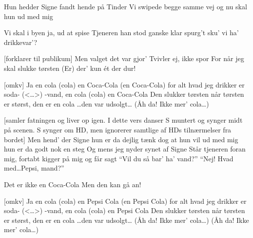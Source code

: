 \documentclass[a4paper,11pt]{article}
\begin{document}
\begin{song}

%
        Hun hedder Signe
        fandt hende på Tinder
        Vi swipede begge samme vej
        og nu skal hun ud med mig


%
        Vi skal i byen
        ja, ud at spise
        Tjeneren han stod ganske klar 
        spurg't sku' vi ha' drikkevar'?


[forklarer til publikum]
        Men valget det var gjor'
        Tvivler ej, ikke spor
        For når jeg skal slukke tørsten
        (Er) der' kun ét der dur!


[omkv]%
        Ja en cola (cola)
        en Coca-Cola (en Coca-Cola)
        for alt hvad jeg drikker er soda- (<{\ldots}>)
        -vand, en cola (cola)
        en Coca-Cola
        Den slukker tørsten når tørsten er størst, den
        er en cola
        {\ldots}den var udsolgt{\ldots}
        (Åh da! Ikke mer' cola{\ldots})


[samler fatningen og liver op igen. I dette vers danser S muntert og synger midt på scenen. S synger om HD, men ignorerer samtlige af HDs tilnærmelser fra bordet]
        Men hend' der Signe
        hun er da dejlig
        tænk dog at hun vil ud med mig
        hun er da godt nok en steg
        Og mens jeg nyder
        synet af Signe
        Står tjeneren foran mig, fortabt 
        kigger på mig og får sagt
        ``Vil du så bar' ha' vand?''
        ``Nej! Hvad med\ldots Pepsi, mand?'' 


%
        Det er ikke en Coca-Cola
        Men den kan gå an!


[omkv]%
        Ja en cola (cola)
        en Pepsi Cola (en Pepsi Cola)
        for alt hvad jeg drikker er soda- (<{\ldots}>)
        -vand, en cola (cola)
        en Pepsi Cola
        Den slukker tørsten når tørsten er størst, den
        er en cola
        {\ldots}den var udsolgt{\ldots}
        (Åh da! Ikke mer' cola{\ldots})
        (Åh da! Ikke mer' cola{\ldots})


\end{song}
\end{document}
